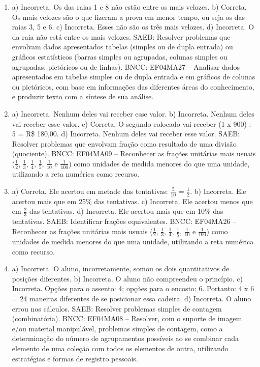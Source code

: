 \begin{enumerate}
\item
a) Incorreta. Os das raias 1 e 8 não estão entre os mais velozes.
b) Correta. Os mais velozes são o que fizeram a prova em menor tempo, ou seja os das raias 3, 5 e 6.
c) Incorreta. Esses não são os três mais velozes.
d) Incorreta. O da raia não está entre os mais velozes.
SAEB: Resolver problemas que envolvam dados apresentados tabelas (simples ou
de dupla entrada) ou gráficos estatísticos (barras simples ou agrupadas,
colunas simples ou agrupadas, pictóricos ou de linhas).
BNCC: EF04MA27 -- Analisar dados apresentados em tabelas simples ou de dupla entrada e em gráficos de
colunas ou pictóricos, com base em informações das diferentes áreas do conhecimento, e produzir
texto com a síntese de sua análise.

\item
a) Incorreta. Nenhum deles vai receber esse valor.
b) Incorreta. Nenhum deles vai receber esse valor.
c) Correta. O segundo colocado vai receber (1 x 900) : 5 = R\$ 180,00.
d) Incorreta. Nenhum deles vai receber esse valor.
SAEB: Resolver problemas que envolvam fração como resultado
de uma divisão (quociente).
BNCC: EF04MA09 -- Reconhecer as frações unitárias mais usuais ($\frac{1}{2}$, $\frac{1}{3}$, $\frac{1}{4}$, $\frac{1}{5}$, $\frac{1}{10}$ e $\frac{1}{100}$) como
unidades de medida menores do que uma unidade, utilizando a reta numérica como recurso.

\item
a) Correta. Ele acertou em metade das tentativas: $\frac{5}{10}$ = $\frac{1}{2}$.
b) Incorreta. Ele acertou mais que em 25\% das tentativas.
c) Incorreta. Ele acertou menos que em $\frac{2}{3}$ das tentativas.
d) Incorreta. Ele acertou mais que em 10\% das tentativas.
SAEB: Identificar frações equivalentes.
BNCC: EF04MA26 -- Reconhecer as frações unitárias mais usuais ($\frac{1}{2}$, $\frac{1}{3}$, $\frac{1}{4}$, $\frac{1}{5}$, $\frac{1}{10}$ e $\frac{1}{100}$) como
unidades de medida menores do que uma unidade, utilizando a reta numérica como recurso.

\item
a) Incorreta. O aluno, incorretamente, somou os dois quantitativos de posições diferentes.
b) Incorreta. O aluno não compreendeu o princípio.
c) Incorreta. Opções para o assento: 4; opções para o encosto: 6. Portanto: 4 x 6 = 24 maneiras diferentes de se posicionar essa cadeira.
d) Incorreta. O aluno errou nos cálculos.
SAEB: Resolver problemas simples de contagem (combinatória).
BNCC: EF04MA08 -- Resolver, com o suporte de imagem e/ou material manipulável, problemas simples
de contagem, como a determinação do número de agrupamentos possíveis ao se combinar cada
elemento de uma coleção com todos os elementos de outra, utilizando estratégias e formas de
registro pessoais.


\end{enumerate}
